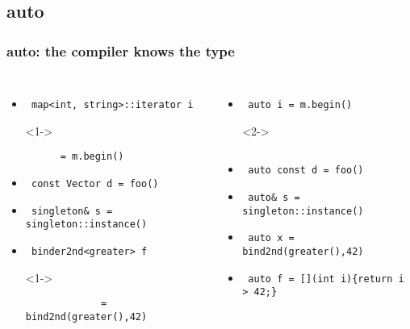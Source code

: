 
\subsection{auto}
\lyxframeend{}


\begin{frame}[fragile]
\frametitle{auto: the compiler knows the type}

\begin{columns}[t]
{\scriptsize
\begin{itemize}
\item  <1->\begin{verbatim} map<int, string>::iterator i   \end{verbatim}
\item[]<1->\begin{verbatim}      = m.begin()\end{verbatim}
\item<1->\begin{verbatim} const Vector d = foo() \end{verbatim}
\item<1->\begin{verbatim} singleton& s = singleton::instance() \end{verbatim}
\item  <1->\begin{verbatim} binder2nd<greater> f   \end{verbatim}
\item[]<1->\begin{verbatim}             = bind2nd(greater(),42) \end{verbatim}
\end{itemize}
}
{\scriptsize
\begin{itemize}
\item<2->\begin{verbatim} auto i = m.begin() \end{verbatim}
\item[]<2->\begin{verbatim}  \end{verbatim}
\item<2->\begin{verbatim} auto const d = foo() \end{verbatim}
\item<2->\begin{verbatim} auto& s = singleton::instance() \end{verbatim}
\item<2->\begin{verbatim} auto x = bind2nd(greater(),42) \end{verbatim}
\item<3->\begin{verbatim} auto f = [](int i){return i > 42;} \end{verbatim}
\end{itemize}
}
\end{columns}
\vskip 24pt


\end{frame}
